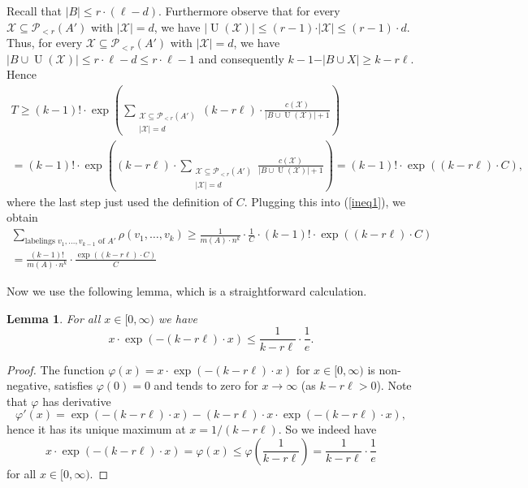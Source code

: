 \documentclass[11pt]{article}
\newtheorem{lemma}[theorem]{Lemma}
\theoremstyle{definition}
\numberwithin{equation}{section}
\begin{document}
Recall that $\vert B\vert\leq r\cdot (\ell-d)$. Furthermore observe that for every $\mathcal{X}\subseteq \mathcal{P}\!_{<r}(A')$ with $\vert \mathcal{X}\vert=d$, we have $\vert \operatorname{U}(\mathcal{X})\vert\leq (r-1)\cdot \vert \mathcal{X}\vert\leq (r-1)\cdot d$. Thus, for every $\mathcal{X}\subseteq \mathcal{P}\!_{<r}(A')$ with $\vert \mathcal{X}\vert=d$, we have $\vert B\cup \operatorname{U}(\mathcal{X})\vert\leq r\cdot \ell-d\leq r\cdot \ell-1$ and consequently $k-1-\vert B\cup X\vert\geq k-r\ell$. Hence
\begin{multline*}
T\geq (k-1)!\cdot \exp\left(\sum_{\substack{\mathcal{X}\subseteq \mathcal{P}\!_{<r}(A')\\\vert \mathcal{X}\vert=d}}(k-r\ell)\cdot \frac{c(\mathcal{X})}{\vert B\cup \operatorname{U}(\mathcal{X})\vert+1}\right)\\
=(k-1)!\cdot \exp\left((k-r\ell)\cdot \sum_{\substack{\mathcal{X}\subseteq \mathcal{P}\!_{<r}(A')\\\vert \mathcal{X}\vert=d}}\frac{c(\mathcal{X})}{\vert B\cup \operatorname{U}(\mathcal{X})\vert+1}\right)=(k-1)!\cdot \exp\left((k-r\ell)\cdot C\right),
\end{multline*}
where the last step just used the definition of $C$. Plugging this into (\ref{ineq1}), we obtain
\begin{multline*}
\sum_{\text{labelings }v_1,\dots, v_{k-1}\text{ of } A'}\rho(v_1,\dots,v_k)
\geq \frac{1}{m(A)\cdot n^k}\cdot \frac{1}{C}\cdot (k-1)!\cdot \exp\left((k-r\ell)\cdot C\right)\\
= \frac{(k-1)!}{m(A)\cdot n^k}\cdot \frac{\exp\left((k-r\ell)\cdot C\right)}{C}
\end{multline*}

Now we use the following lemma, which is a straightforward calculation.

\begin{lemma}\label{lemma2}For all $x\in [0,\infty)$ we have
\[x\cdot \exp(-(k-r\ell)\cdot x)\leq \frac{1}{k-r\ell}\cdot \frac{1}{e}.\]
\end{lemma}
\begin{proof}
The function $\varphi(x)=x\cdot \exp(-(k-r\ell)\cdot x)$ for $x\in [0,\infty)$ is non-negative, satisfies $\varphi(0)=0$ and tends to zero for $x\to \infty$ (as $k-r\ell>0$). Note that $\varphi$ has derivative
\[\varphi'(x)=\exp(-(k-r\ell)\cdot x)-(k-r\ell)\cdot x\cdot \exp(-(k-r\ell)\cdot x),\]
hence it has its unique maximum at $x=1/(k-r\ell)$. So we indeed have \[x\cdot \exp(-(k-r\ell)\cdot x)=\varphi(x)\leq \varphi\left(\frac{1}{k-r\ell}\right)= \frac{1}{k-r\ell}\cdot \frac{1}{e}\]
for all $x\in [0,\infty)$.
\end{proof}
\end{document}
